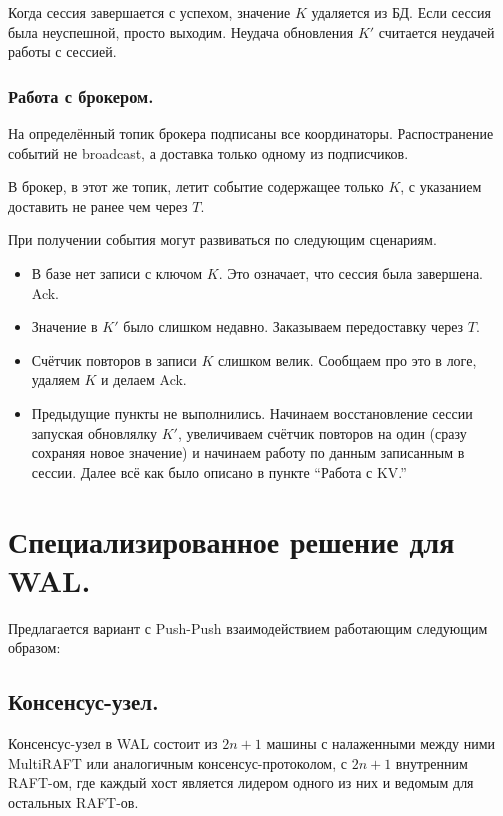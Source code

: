 \documentclass[a4paper,12pt]{article}
\begin{document}
    Когда сессия завершается с успехом, значение $K$ удаляется из БД. Если сессия была неуспешной, просто выходим. Неудача обновления $K'$ считается
    неудачей работы с сессией.

    \subsubsection{Работа с брокером.}

    На определённый топик брокера подписаны все координаторы. Распостранение событий не broadcast, а доставка только одному из подписчиков.

    \smallskip
    В брокер, в этот же топик, летит событие содержащее только $K$, с указанием доставить не ранее чем через $T$.

    \smallskip
    При получении события могут развиваться по следующим сценариям.

    \begin{itemize}
        \item В базе нет записи с ключом $K$. Это означает, что сессия была завершена. Ack.
        \item Значение в $K'$ было слишком недавно. Заказываем передоставку через $T$.
        \item Счётчик повторов в записи $K$ слишком велик. Сообщаем про это в логе, удаляем $K$ и делаем Ack.
        \item Предыдущие пункты не выполнились. Начинаем восстановление сессии запуская обновлялку $K'$, увеличиваем счётчик повторов на один (сразу сохраняя
        новое значение) и начинаем работу по данным записанным в сессии. Далее всё как было описано в пункте \enquote{Работа с KV.}
    \end{itemize}


    \section{Специализированное решение для WAL.}

    Предлагается вариант с Push-Push взаимодействием работающим следующим образом:

    \subsection{Консенсус-узел.}

    Консенсус-узел в WAL состоит из $2n + 1$ машины с налаженными между ними MultiRAFT или аналогичным консенсус-протоколом, с $2n + 1$ внутренним
    RAFT-ом, где каждый хост является лидером одного из них и ведомым для остальных RAFT-ов.
\end{document}

